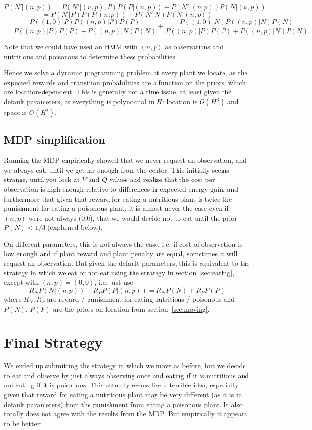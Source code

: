 \documentclass{article}
\begin{document}
$$P(N'|(n,p))=P(N'|(n,p),P)P(P|(n,p))+P(N'|(n,p))P(N|(n,p))$$
$$=P(N'|P)P(P|(n,p))+P(N'|N)P(N|(n,p))$$
$$=\frac{P((1,0)|P)P((n,p)|P)P(P)}{P((n,p)|P)P(P)+P((n,p)|N)P(N)} + \frac{P((1,0)|N)P((n,p)|N)P(N)}{P((n,p)|P)P(P)+P((n,p)|N)P(N)}$$

Note that we could have used an HMM with $(n,p)$ as observations 
and nutritious and poisonous to determine these probabilities. 

Hence we solve a dynamic programming problem at every plant we locate,
as the expected rewards and transition probabilities are a function on
the priors, which are location-dependent. This is generally not a time issue,
at least given the default parameters, 
as everything is polynomial in $H$: location is $O(H^3)$ and space is $O(H^2)$. 


\subsection{MDP simplification}
Running the MDP empirically showed that we never request an observation,
and we always eat, until we get far enough from the center. 
This initially seems strange, until you look at $V$ and $Q$ values and
realize that the cost per observation is high enough relative to differences
in expected energy gain, and furthermore that given that reward for eating a nutritious
plant is twice the punishment for eating a poisonous plant, it is almost 
never the case even if $(n,p)$ were not always (0,0), that we would decide
not to eat until the prior $P(N)<1/3$ (explained below). 

On different
parameters, this is not always the case, i.e. if cost of observation is
low enough and if plant reward and plant penalty are equal, sometimes it
will request an observation. But given the default parameters, this is 
equivalent to the strategy in which we eat or not eat using the
strategy in section~\ref{sec:eating}, except with $(n,p)=(0,0)$, i.e. 
just use 
$$R_N P(N|(n,p)) +R_P  P(P|(n,p))=R_N P(N) + R_P P(P)$$ 
where $R_N,R_P$ are reward / punishment for eating nutritious / poisonous
and $P(N)$, $P(P)$ are the priors on location from section~\ref{sec:moving}. 



\section{Final Strategy}
We ended up submitting the strategy in which we move as before, but we
decide to eat and observe by just always observing once and eating if 
it is nutritious and not eating if it is poisonous. This actually seems
like a terrible idea, especially given that reward for eating a nutritious
plant may be very different (as it is in default parameters) from the
punishment from eating a poisonous plant. It also totally does not agree
with the results from the MDP. But empirically it appears to be better:
\end{document}

